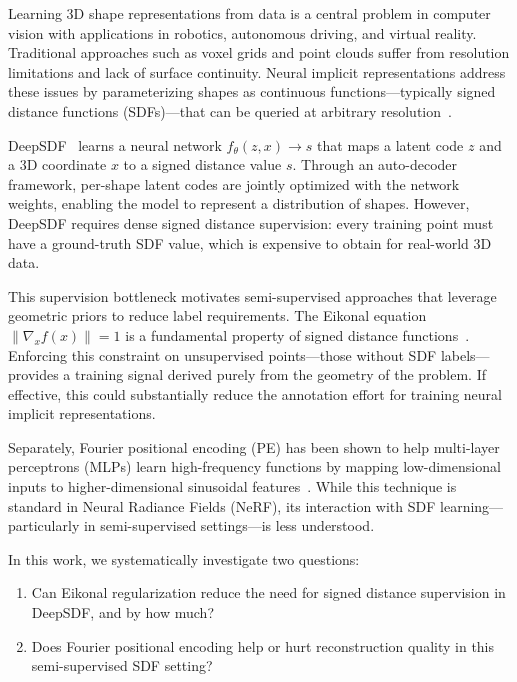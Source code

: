 \documentclass[conference]{IEEEtran}
\begin{document}
Learning 3D shape representations from data is a central problem in computer vision with applications in robotics, autonomous driving, and virtual reality. Traditional approaches such as voxel grids and point clouds suffer from resolution limitations and lack of surface continuity. Neural implicit representations address these issues by parameterizing shapes as continuous functions---typically signed distance functions (SDFs)---that can be queried at arbitrary resolution~\cite{deepsdf}.

DeepSDF~\cite{deepsdf} learns a neural network $f_\theta(z, x) \to s$ that maps a latent code $z$ and a 3D coordinate $x$ to a signed distance value $s$. Through an auto-decoder framework, per-shape latent codes are jointly optimized with the network weights, enabling the model to represent a distribution of shapes. However, DeepSDF requires dense signed distance supervision: every training point must have a ground-truth SDF value, which is expensive to obtain for real-world 3D data.

This supervision bottleneck motivates semi-supervised approaches that leverage geometric priors to reduce label requirements. The Eikonal equation $\|\nabla_x f(x)\| = 1$ is a fundamental property of signed distance functions~\cite{igr}. Enforcing this constraint on unsupervised points---those without SDF labels---provides a training signal derived purely from the geometry of the problem. If effective, this could substantially reduce the annotation effort for training neural implicit representations.

Separately, Fourier positional encoding (PE) has been shown to help multi-layer perceptrons (MLPs) learn high-frequency functions by mapping low-dimensional inputs to higher-dimensional sinusoidal features~\cite{nerf, fourierfeatures}. While this technique is standard in Neural Radiance Fields (NeRF), its interaction with SDF learning---particularly in semi-supervised settings---is less understood.

In this work, we systematically investigate two questions:
\begin{enumerate}
    \item Can Eikonal regularization reduce the need for signed distance supervision in DeepSDF, and by how much?
    \item Does Fourier positional encoding help or hurt reconstruction quality in this semi-supervised SDF setting?
\end{enumerate}
\end{document}
